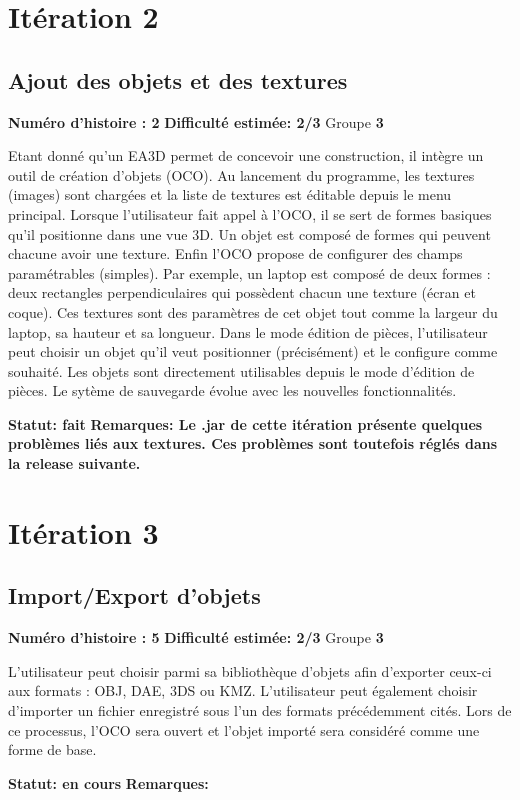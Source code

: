 \documentclass[a4paper]{article} \usepackage{framed} \usepackage{fullpage} \usepackage[french]{babel} \usepackage[utf8]{inputenc} \usepackage[T1]{fontenc}
\begin{document}
\section{Itération 2}
\begin{framed}
\subsection{Ajout des objets et des textures}

\textbf{Numéro d'histoire : 2}  
\textbf{Difficulté estimée: 2/3}  Groupe \textbf{3}

Etant donné qu'un EA3D permet de concevoir une construction, il intègre un outil de création d'objets (OCO). Au lancement du programme, les textures (images) sont chargées et la liste de textures est éditable depuis le menu principal.
Lorsque l'utilisateur fait appel à l'OCO, il se sert de formes basiques qu'il positionne dans une vue 3D. Un objet est composé de formes qui peuvent chacune avoir une texture. Enfin l'OCO propose de configurer des champs paramétrables (simples). Par exemple, un laptop est composé de deux formes : deux rectangles perpendiculaires qui possèdent chacun une texture (écran et coque). Ces textures sont des paramètres de cet objet tout comme la largeur du laptop, sa hauteur et sa longueur.
Dans le mode édition de pièces, l'utilisateur peut choisir un objet qu'il veut positionner (précisément) et le configure comme souhaité. Les objets sont directement utilisables depuis le mode d'édition de pièces. Le sytème de sauvegarde évolue avec les nouvelles fonctionnalités.

\textbf{Statut: fait}  \textbf{Remarques: Le .jar de cette itération présente quelques problèmes liés aux textures. Ces problèmes sont toutefois réglés dans la release suivante.}
\end{framed}

\section{Itération 3}
\begin{framed}
\subsection{Import/Export d'objets}

\textbf{Numéro d'histoire : 5}  
\textbf{Difficulté estimée: 2/3}  Groupe \textbf{3}

L'utilisateur peut choisir parmi sa bibliothèque d'objets afin d'exporter ceux-ci aux formats : OBJ, DAE, 3DS ou KMZ.
L'utilisateur peut également choisir d'importer un fichier enregistré sous l'un des formats précédemment cités. Lors de ce processus, l'OCO sera ouvert et l'objet importé sera considéré comme une forme de base.

\textbf{Statut: en cours}  \textbf{Remarques:}
\end{framed}
\end{document}
